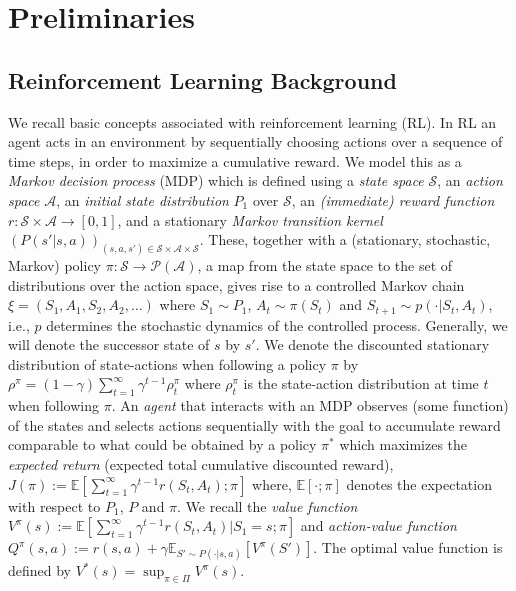 \documentclass[letterpaper]{article}
\newcommand{\cA}{{\mathcal A}}
\newcommand{\cS}{{\mathcal S}}
\newcommand{\cP}{{\mathcal P}}
\newcommand{\E}{{\mathbb E}}
\newcommand{\R}{{\mathbb R}}
\begin{document}
\section{Preliminaries}

\subsection{Reinforcement Learning Background} \label{RLbackground}

We recall basic concepts associated with reinforcement learning (RL). In RL an agent acts in an environment by sequentially choosing actions over a sequence of time steps, in order to maximize a cumulative reward. We model this as a \emph{Markov decision process} (MDP) which is defined using 
a \emph{state space} $\cS$, 
an \emph{action space} $\cA$, 
an \emph{initial state distribution} $P_1$ over $\cS$, 
an \emph{(immediate) reward function} $r: \cS \times \cA \to [0,1]$,
and a stationary \emph{Markov transition kernel} $(P(s' |s,a))_{(s,a,s')\in \cS \times \cA \times \cS}$. 
These, together with a (stationary, stochastic, Markov) policy $\pi: \cS \to \cP(\cA)$, a map from the state space to the set of distributions over the action space, gives rise to a controlled Markov chain $\xi=(S_1,A_1,S_2,A_2,\dots)$ where $S_1 \sim P_1$, $A_t \sim \pi(S_t)$ and $S_{t+1} \sim p(\cdot|S_t,A_t)$, i.e., $p$ determines the stochastic dynamics of the controlled process.
Generally, we will denote the successor state of $s$ by $s'$. 
We denote the discounted stationary distribution of state-actions when following a policy $\pi$ by $\rho^\pi = (1-\gamma)\sum_{t=1}^\infty \gamma^{t-1}  \rho_t^\pi$ where $\rho_t^\pi$ is the state-action distribution at time $t$ when following $\pi$. 
An \emph{agent} that interacts with an MDP observes (some function) of the states and selects actions sequentially with the goal 
to accumulate reward comparable to what could be obtained by a policy $\pi^*$ which maximizes the \emph{expected return} (expected total cumulative discounted reward), $J(\pi):= \E [\sum_{t=1}^\infty \gamma^{t-1} r(S_t,A_t) ; \pi]$ where,  $\E [ \cdot ; \pi]$ denotes the expectation with respect to $P_1$, $P$ and $\pi$. We recall the \emph{value function} $V^\pi(s) :=  \E [\sum_{t=1}^\infty \gamma^{t-1} r(S_t,A_t) | S_1 =s ; \pi]$ and \emph{action-value function} $Q^\pi(s,a) := r(s,a) + \gamma \E_{S'\sim P(\cdot|s,a)} [V^\pi(S')]$. The optimal value function is defined by $V^*(s) = \sup_{\pi\in\Pi} V^\pi(s)$.
\end{document}
